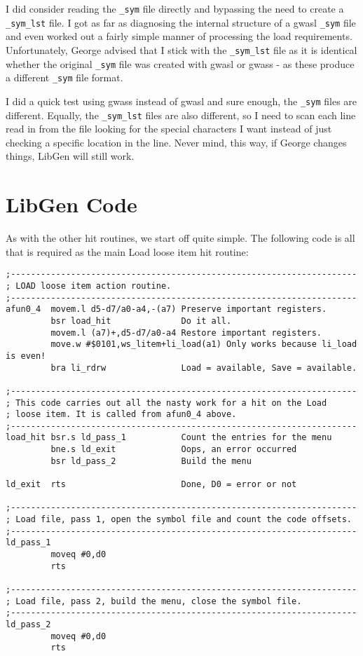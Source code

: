 I did consider reading the \nolinkurl{_sym} file directly
    and bypassing the need to create a \nolinkurl{_sym_lst} file. I
    got as far as diagnosing the internal structure of a
 gwasl \nolinkurl{_sym} file and even
    worked out a fairly simple manner of processing the load requirements.
    Unfortunately, George advised that I stick with the
 \nolinkurl{_sym_lst} file as it is identical whether the original
 \nolinkurl{_sym} file was created with
 gwasl or gwass -{} as
    these produce a different \nolinkurl{_sym} file format.

I did a quick test using gwass instead of
 gwasl and sure enough, the
 \nolinkurl{_sym} files are different. Equally, the
 \nolinkurl{_sym_lst} files are also different, so I need to scan
    each line read in from the file looking for the special characters I want
    instead of just checking a specific location in the line. Never mind, this
    way, if George changes things, LibGen will
    still work.

\section{LibGen Code}

As with the other hit routines, we start off quite simple. The
    following code is all that is required as the main Load loose item hit
    routine:

\begin{lstlisting}[firstnumber=1,]
;---------------------------------------------------------------------
; LOAD loose item action routine.
;---------------------------------------------------------------------
afun0_4  movem.l d5-d7/a0-a4,-(a7) Preserve important registers.
         bsr load_hit              Do it all.
         movem.l (a7)+,d5-d7/a0-a4 Restore important registers.
         move.w #$0101,ws_litem+li_load(a1) Only works because li_load is even!
         bra li_rdrw               Load = available, Save = available.

;---------------------------------------------------------------------
; This code carries out all the nasty work for a hit on the Load
; loose item. It is called from afun0_4 above.
;---------------------------------------------------------------------
load_hit bsr.s ld_pass_1           Count the entries for the menu
         bne.s ld_exit             Oops, an error occurred
         bsr ld_pass_2             Build the menu
         
ld_exit  rts                       Done, D0 = error or not

;---------------------------------------------------------------------
; Load file, pass 1, open the symbol file and count the code offsets.
;---------------------------------------------------------------------
ld_pass_1
         moveq #0,d0
         rts

;---------------------------------------------------------------------
; Load file, pass 2, build the menu, close the symbol file.
;---------------------------------------------------------------------
ld_pass_2
         moveq #0,d0
         rts
\end{lstlisting}

